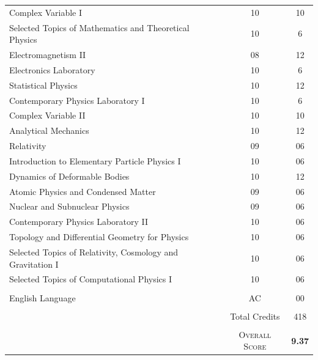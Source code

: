 \documentclass[a4paper,10pt]{article} %
\begin{document}
\begin{center}
\begin{tabular}{lcc}
Complex Variable I & 10 & 10\\
Selected Topics of Mathematics and Theoretical Physics & 10 & 6\\
Electromagnetism II & 08 & 12\\
Electronics Laboratory & 10 & 6\\
Statistical Physics & 10 &12\\
Contemporary Physics Laboratory I & 10 & 6\\
Complex Variable II & 10 & 10\\
Analytical Mechanics & 10 & 12\\
Relativity & 09 & 06\\
Introduction to Elementary Particle Physics I & 10 & 06\\
Dynamics of Deformable Bodies & 10 & 12\\
Atomic Physics and Condensed Matter & 09 & 06\\
Nuclear and Subnuclear Physics & 09 & 06\\
Contemporary Physics Laboratory II & 10 & 06\\
Topology and Differential Geometry for Physics & 10 & 06\\
Selected Topics of Relativity, Cosmology and Gravitation I & 10 & 06\\
Selected Topics of Computational Physics I& 10 & 06\\ \\
English Language & AC &	00\\ \\
& Total Credits & 418\\ \\
&\textsc{Overall Score}&\textbf{9.37}
\end{tabular}
\end{center}
\vspace{5cm}

\end{document}
